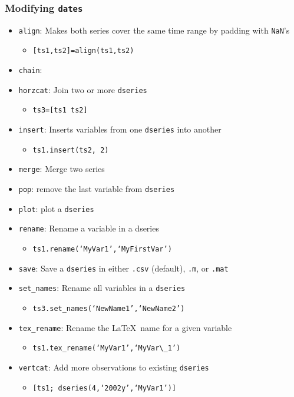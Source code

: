 \documentclass[10pt]{beamer}
\begin{document}
\begin{frame}[fragile,t]
  \frametitle{Modifying \texttt{dates}}
  \begin{itemize}
  \item \texttt{align}: Makes both series cover the same time range by padding with \texttt{NaN}'s
    \begin{itemize}
    \item \texttt{[ts1,ts2]=align(ts1,ts2)}
    \end{itemize}
  \item \texttt{chain}:
  \item \texttt{horzcat}: Join two or more \texttt{dseries}
    \begin{itemize}
    \item \texttt{ts3=[ts1 ts2]}
    \end{itemize}
  \item \texttt{insert}: Inserts variables from one \texttt{dseries} into another
    \begin{itemize}
    \item \texttt{ts1.insert(ts2, 2)}
    \end{itemize}
  \item \texttt{merge}: Merge two series
  \item \texttt{pop}: remove the last variable from \texttt{dseries}
  \item \texttt{plot}: plot a \texttt{dseries}
  \item \texttt{rename}: Rename a variable in a dseries
    \begin{itemize}
    \item \texttt{ts1.rename(`MyVar1',`MyFirstVar')}
    \end{itemize}
  \item \texttt{save}: Save a \texttt{dseries} in either \texttt{.csv} (default), \texttt{.m}, or \texttt{.mat}
  \item \texttt{set\_names}: Rename all variables in a \texttt{dseries}
    \begin{itemize}
    \item \texttt{ts3.set\_names(`NewName1',`NewName2')}
    \end{itemize}
  \item \texttt{tex\_rename}: Rename the \LaTeX\ name for a given variable
    \begin{itemize}
    \item \texttt{ts1.tex\_rename(`MyVar1',`MyVar\textbackslash\_1')}
    \end{itemize}
  \item \texttt{vertcat}: Add more observations to existing \texttt{dseries}
    \begin{itemize}
    \item \texttt{[ts1; dseries(4,`2002y',`MyVar1')]}
    \end{itemize}
  \end{itemize}
\end{frame}
\end{document}
